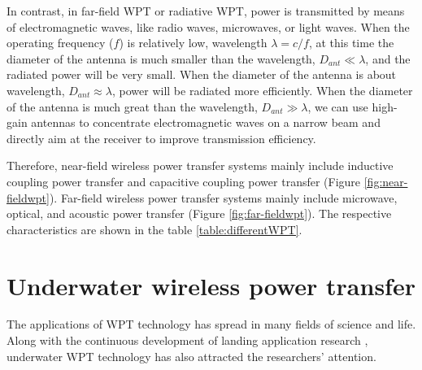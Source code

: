 In contrast, in far-field WPT or radiative WPT, power is transmitted by means of electromagnetic waves, like radio waves, microwaves, or light waves. 
When the operating frequency ($f$) is relatively low, wavelength $\lambda = c/f$, at this time the diameter of the antenna is much smaller than the wavelength, $D_{ant} \ll \lambda$, and the radiated power will be very small. 
When the diameter of the antenna is about wavelength, $D_{ant} \approx \lambda$, power will be radiated more efficiently. 
When the diameter of the antenna is much great than the wavelength, $D_{ant} \gg \lambda$, we can use high-gain antennas to concentrate electromagnetic waves on a narrow beam and directly aim at the receiver to improve transmission efficiency.

Therefore, near-field wireless power transfer systems mainly include inductive coupling power transfer and capacitive coupling power transfer (Figure \ref{fig:near-fieldwpt}). Far-field wireless power transfer systems mainly include microwave, optical, and acoustic power transfer (Figure \ref{fig:far-fieldwpt}). The respective characteristics are shown in the table \ref{table:differentWPT}.


\section{Underwater wireless power transfer}
The applications of WPT technology has spread in many fields of science and life.
Along with the continuous development of landing application research \cite{Zhang2019}, underwater WPT technology has also attracted the researchers' attention. 
